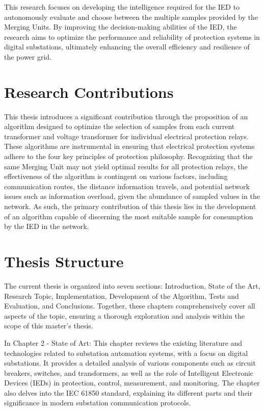 This research focuses on developing the intelligence required for the IED to autonomously evaluate and choose between the multiple samples provided by the Merging Units. By improving the decision-making abilities of the IED, the research aims to optimize the performance and reliability of protection systems in digital substations, ultimately enhancing the overall efficiency and resilience of the power grid.

\section{Research Contributions}
This thesis introduces a significant contribution through the proposition of an algorithm designed to optimize the selection of samples from each current transformer and voltage transformer for individual electrical protection relays. These algorithms are instrumental in ensuring that electrical protection systems adhere to the four key principles of protection philosophy. Recognizing that the same Merging Unit may not yield optimal results for all protection relays, the effectiveness of the algorithm is contingent on various factors, including communication routes, the distance information travels, and potential network issues such as information overload, given the abundance of sampled values in the network. As such, the primary contribution of this thesis lies in the development of an algorithm capable of discerning the most suitable sample for consumption by the IED in the network.

\section{Thesis Structure}

The current thesis is organized into seven sections: Introduction, State of the Art, Research Topic, Implementation, Development of the Algorithm, Tests and Evaluation, and Conclusions. Together, these chapters comprehensively cover all aspects of the topic, ensuring a thorough exploration and analysis within the scope of this master's thesis.

In Chapter 2 - State of Art: This chapter reviews the existing literature and technologies related to substation automation systems, with a focus on digital substations. It provides a detailed analysis of various components such as circuit breakers, switches, and transformers, as well as the role of Intelligent Electronic Devices (IEDs) in protection, control, measurement, and monitoring. The chapter also delves into the IEC 61850 standard, explaining its different parts and their significance in modern substation communication protocols.

